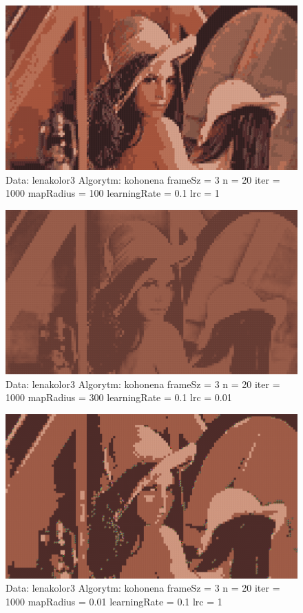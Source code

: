 \documentclass{classrep}
\begin{document}
{{{\begin{figure}[h!]
\centering
 \includegraphics[width=12cm]{img/neural_1.png}
 \vspace{-0.0cm}
 \caption{Data: lenakolor3 Algorytm: kohonena frameSz = 3 n = 20 iter = 1000 mapRadius = 100 learningRate = 0.1 lrc = 1
}
\end{figure}

\newpage

\begin{figure}[h!]
\centering
 \includegraphics[width=12cm]{img/neural_3.png}
 \vspace{-0.0cm}
 \caption{Data: lenakolor3 Algorytm: kohonena frameSz = 3 n = 20 iter = 1000 mapRadius = 300 learningRate = 0.1 lrc = 0.01
}
\end{figure}

\begin{figure}[h!]
\centering
 \includegraphics[width=12cm]{img/neural_4.png}
 \vspace{-0.0cm}
 \caption{Data: lenakolor3 Algorytm: kohonena frameSz = 3 n = 20 iter = 1000 mapRadius = 0.01 learningRate = 0.1 lrc = 1
}
\end{figure}

}}}
\end{document}
